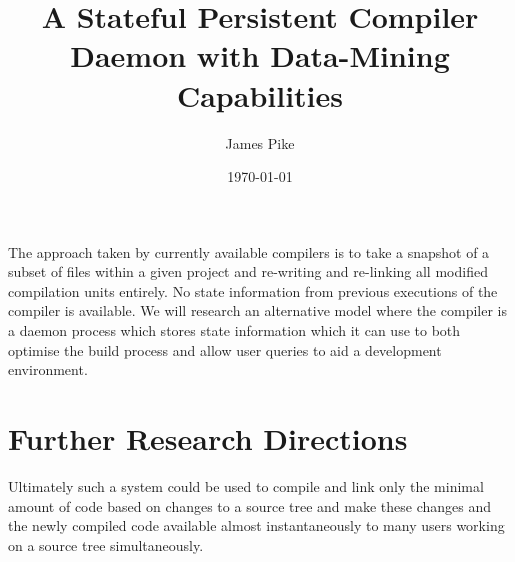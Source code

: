 \documentclass{article}
\begin{document}
\title{A Stateful Persistent Compiler Daemon with Data-Mining Capabilities}
\author{James Pike}
\date{\today}

\maketitle

The approach taken by currently available compilers is to take a snapshot
of a subset of files within a given project and re-writing and re-linking all
modified compilation units entirely. No state information from previous
executions of the compiler is available. We will research an alternative 
model where the compiler is a daemon process which stores state information 
which it can use to both optimise the build process and allow user queries to 
aid a development environment. 

\section*{Further Research Directions}

Ultimately such a system could be used to compile and link only the minimal 
amount of code based on changes to a source tree and make these changes and 
the newly compiled code available almost instantaneously to many users 
working on a source tree simultaneously.

% 
% 
\end{document}
